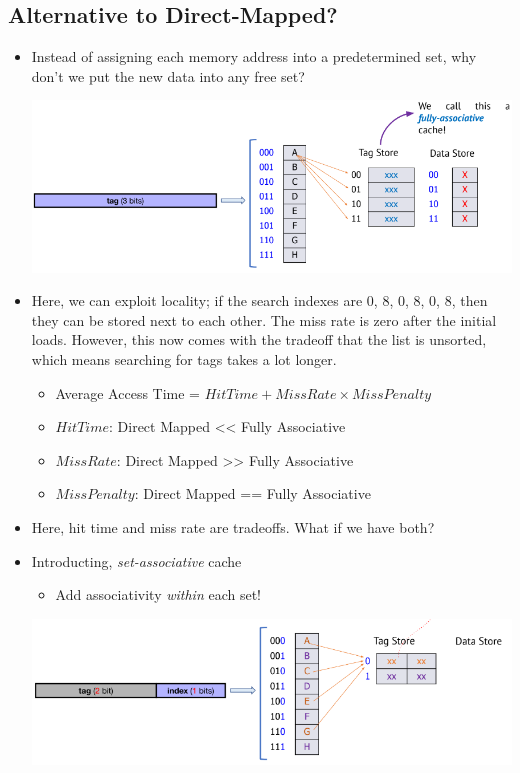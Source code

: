 \documentclass[10pt]{article}
\begin{document}
\subsection*{Alternative to Direct-Mapped?}
\begin{itemize}
    \item Instead of assigning each memory address into a predetermined set, why don't we put the new data into any free set?
    \begin{center}
        \includegraphics*[scale=0.8]{W6_10.png}
    \end{center}
    \item Here, we can exploit locality; if the search indexes are 0, 8, 0, 8, 0, 8, then they can be stored next to each other.  The miss rate is zero after the initial loads.  However, this now comes with the tradeoff that the list is unsorted, which means searching for tags takes a lot longer.
    \begin{itemize}
        \item Average Access Time = $HitTime + MissRate \times MissPenalty$
        \item $HitTime$: Direct Mapped << Fully Associative
        \item $MissRate$: Direct Mapped >> Fully Associative
        \item $MissPenalty$: Direct Mapped == Fully Associative
    \end{itemize}
    \item Here, hit time and miss rate are tradeoffs.  What if we have both?
    \item Introducting, \textit{set-associative} cache
    \begin{itemize}
        \item Add associativity \textit{within} each set!
    \end{itemize}
    \begin{center}
        \includegraphics*[scale=0.8]{W6_11.png}

\end{center}
\end{itemize}
\end{document}
